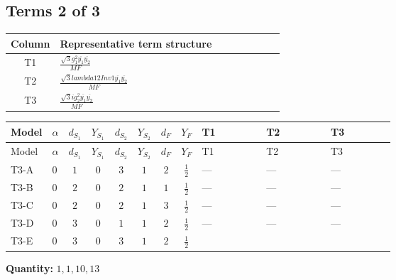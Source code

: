 \documentclass[8pt]{article}
\begin{document}
\begin{landscape}
\subsection*{Terms 2 of 3}
\begin{center}
\begin{tabular}{@{}c >{\raggedright\arraybackslash}p{0.82\linewidth}@{}}
\toprule
Column & Representative term structure \\
\midrule
T1 & \(\displaystyle \frac{\sqrt{3} g_{1}^{2} \overline{y_{1}} \overline{y_{2}}}{MF}\) \\
\midrule
T2 & \(\displaystyle \frac{\sqrt{3} lambda12Inv1 \overline{y_{1}} \overline{y_{2}}}{MF}\) \\
\midrule
T3 & \(\displaystyle \frac{\sqrt{3} i g_{2}^{2} \overline{y_{1}} \overline{y_{2}}}{MF}\) \\
\midrule
\bottomrule
\end{tabular}
\end{center}
\smallskip
\tiny
\begin{longtable}{@{}llcccccc >{\raggedright\arraybackslash}p{0.21\linewidth} >{\raggedright\arraybackslash}p{0.21\linewidth} >{\raggedright\arraybackslash}p{0.21\linewidth}@{}}
\toprule
Model & $\alpha$ & $d_{S_1}$ & $Y_{S_1}$ & $d_{S_2}$ & $Y_{S_2}$ & $d_F$ & $Y_F$ & T1 & T2 & T3 \\
\midrule
\endfirsthead
\toprule
Model & $\alpha$ & $d_{S_1}$ & $Y_{S_1}$ & $d_{S_2}$ & $Y_{S_2}$ & $d_F$ & $Y_F$ & T1 & T2 & T3 \\
\midrule
\endhead
T3-A & $0$ & $1$ & $0$ & $3$ & $1$ & $2$ & $\frac{1}{2}$ & --- & --- & --- \\
\midrule
T3-B & $0$ & $2$ & $0$ & $2$ & $1$ & $1$ & $\frac{1}{2}$ & --- & --- & --- \\
\midrule
T3-C & $0$ & $2$ & $0$ & $2$ & $1$ & $3$ & $\frac{1}{2}$ & --- & --- & --- \\
\midrule
T3-D & $0$ & $3$ & $0$ & $1$ & $1$ & $2$ & $\frac{1}{2}$ & --- & --- & --- \\
\midrule
T3-E & $0$ & $3$ & $0$ & $3$ & $1$ & $2$ & $\frac{1}{2}$ & \scriptsize\adjustbox{max width=\linewidth}{$\begin{gathered} - \frac{\sqrt{3} g_{1}^{2} \overline{y_{1}} \overline{y_{2}}}{8 MF}\end{gathered}$} & \scriptsize\adjustbox{max width=\linewidth}{$\begin{gathered} \frac{\sqrt{3} lambda12Inv1 \overline{y_{1}} \overline{y_{2}}}{6 MF}\end{gathered}$} & \scriptsize\adjustbox{max width=\linewidth}{$\begin{gathered} \frac{\sqrt{3} i g_{2}^{2} \overline{y_{1}} \overline{y_{2}}}{6 MF}\end{gathered}$} \\
\midrule
\bottomrule
\end{longtable}
\clearpage
\noindent\textbf{Quantity: }$\mathrm{1,1,10,13}$\par\smallskip

\end{landscape}
\end{document}
